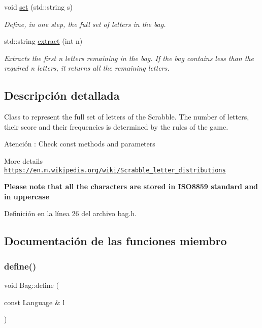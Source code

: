 \begin{DoxyCompactItemize}
void \hyperlink{classBag_a3de5aa1629a7fdd40630d140adde2757}{set} (std\+::string s)
\begin{DoxyCompactList}\small\item\em Define, in one step, the full set of letters in the bag. \end{DoxyCompactList}\item 
std\+::string \hyperlink{classBag_ac75abe2b7626e50109a1add3382978af}{extract} (int n)
\begin{DoxyCompactList}\small\item\em Extracts the first {\ttfamily n} letters remaining in the bag. If the bag contains less than the required {\ttfamily n} letters, it returns all the remaining letters. \end{DoxyCompactList}\end{DoxyCompactItemize}


\subsection{Descripción detallada}
Class to represent the full set of letters of the Scrabble. The number of letters, their score and their frequencies is determined by the rules of the game. 

\begin{DoxyWarning}{Atención}
\+: Check const methods and parameters
\end{DoxyWarning}
More details \href{https://en.m.wikipedia.org/wiki/Scrabble_letter_distributions}{\tt https\+://en.\+m.\+wikipedia.\+org/wiki/\+Scrabble\+\_\+letter\+\_\+distributions}

{\bfseries Please note that all the characters are stored in I\+S\+O8859 standard and in uppercase} 

Definición en la línea 26 del archivo bag.\+h.



\subsection{Documentación de las funciones miembro}
\mbox{\label{classBag_ad380d36f2628b3ffe0ca19cfe53d7c19}} 
\subsubsection{\texorpdfstring{define()}{define()}}
{\footnotesize\ttfamily void Bag\+::define (\begin{DoxyParamCaption}\item[{const Language \&}]{l }\end{DoxyParamCaption})}




